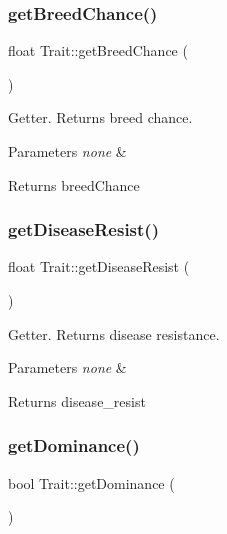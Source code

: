 \subsubsection{\texorpdfstring{get\+Breed\+Chance()}{getBreedChance()}}
{\footnotesize\ttfamily float Trait\+::get\+Breed\+Chance (\begin{DoxyParamCaption}{ }\end{DoxyParamCaption})}

Getter. Returns breed chance. 
\begin{DoxyParams}{Parameters}
{\em none} & \\
\hline
\end{DoxyParams}
\begin{DoxyReturn}{Returns}
breed\+Chance 
\end{DoxyReturn}
\mbox{\label{class_trait_a4d065437505563d16c1f5cae912d8383}} 
\subsubsection{\texorpdfstring{get\+Disease\+Resist()}{getDiseaseResist()}}
{\footnotesize\ttfamily float Trait\+::get\+Disease\+Resist (\begin{DoxyParamCaption}{ }\end{DoxyParamCaption})}

Getter. Returns disease resistance. 
\begin{DoxyParams}{Parameters}
{\em none} & \\
\hline
\end{DoxyParams}
\begin{DoxyReturn}{Returns}
disease\+\_\+resist 
\end{DoxyReturn}
\mbox{\label{class_trait_af5cd74fadebbb43800c2ae93a5007de1}} 
\subsubsection{\texorpdfstring{get\+Dominance()}{getDominance()}}
{\footnotesize\ttfamily bool Trait\+::get\+Dominance (\begin{DoxyParamCaption}{ }\end{DoxyParamCaption})}


